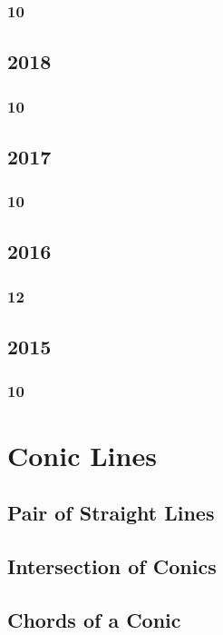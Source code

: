 \documentclass[11pt]{book}
\begin{document}
\subsection{10}

\section{2018}
\subsection{10}

\section{2017}
\subsection{10}



\section{2016}
\subsection{12}

\section{2015}
\subsection{10}






% 
\backmatter
\appendix
\iffalse
\chapter{Conic Lines}
\section{Pair of Straight Lines}
%

\section{Intersection of Conics}

\section{ Chords of a Conic}

\end{document}
